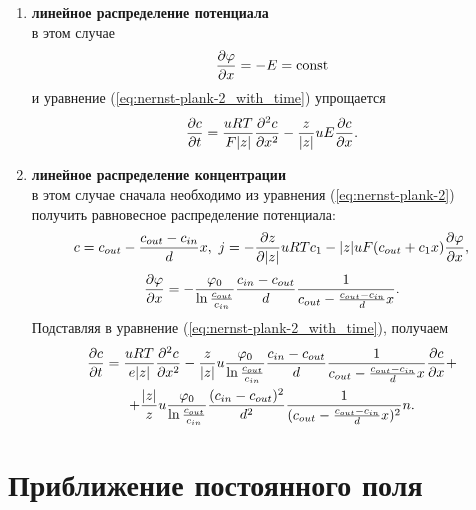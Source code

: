     \begin{enumerate}
        \item \textbf{линейное распределение потенциала}\\
            в этом случае
            \[
                \frac{\partial \varphi}{\partial x} = -E = \mathrm{const}
            \]
            и уравнение (\ref{eq:nernst-plank-2_with_time}) упрощается
            \[
                \frac{\partial c}{\partial t} = \frac{uRT}{F|z|}\frac{\partial^2 c}{\partial {x}^2} -
                    \frac{z}{|z|}uE\frac{\partial c}{\partial x}.
            \]
        \item \textbf{линейное распределение концентрации}\\
            в этом случае сначала необходимо из уравнения
            (\ref{eq:nernst-plank-2}) получить равновесное распределение
            потенциала:
            \[
                c = c_{out} - \frac{c_{out} - c_{in}}{d} x,\ j = -\frac{\partial z}{\partial |z|}uRTc_1 -
                    |z|uF(c_{out}+c_1x)\frac{\partial \varphi}{\partial x},
            \]
            \[
                \frac{\partial \varphi}{\partial x} = -\frac{\varphi_0}{\ln\frac{c_{out}}{c_{in}}}
                \frac{c_{in} - c_{out}}{d}
                \frac{1}{c_{out} - \frac{c_{out} - c_{in}}{d} x}.
            \]
            Подставляя в уравнение (\ref{eq:nernst-plank-2_with_time}), получаем
            \begin{gather*}
                \frac{\partial c}{\partial t} = \frac{uRT}{e|z|}\frac{\partial^2 c}{\partial {x}^2} -
                \frac{z}{|z|}u\frac{\varphi_0}{\ln\frac{c_{out}}{c_{in}}}
                \frac{c_{in} - c_{out}}{d}
                \frac{1}{c_{out} - \frac{c_{out} - c_{in}}{d} x}
                \frac{\partial c}{\partial x} + \\
                + \frac{|z|}{z}u\frac{\varphi_0}{\ln\frac{c_{out}}{c_{in}}}
                \frac{(c_{in} - c_{out})^2}{d^2}
                \frac{1}{(c_{out} - \frac{c_{out} - c_{in}}{d} x)^2}n.
            \end{gather*}
    \end{enumerate}

\section{Приближение постоянного поля}
